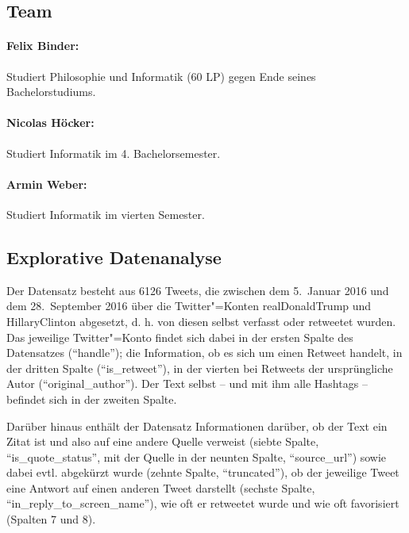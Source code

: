 \documentclass[BCOR0mm,fontsize=12pt,paper=a4,final,numbers=noenddot]{scrartcl}
\begin{document}

\subsection{Team}

\paragraph*{Felix Binder:} Studiert Philosophie und Informatik (60 LP) gegen Ende seines Bachelorstudiums.

\paragraph*{Nicolas Höcker:} Studiert Informatik im 4. Bachelorsemester.

\paragraph*{Armin Weber:} Studiert Informatik im vierten Semester.


\subsection{Explorative Datenanalyse}

Der Datensatz besteht aus 6126 Tweets, die zwischen dem 5.~Januar 2016 und dem 28.~September 2016 über die Twitter"=Konten realDonaldTrump und HillaryClinton abgesetzt, d.\,\,h. von diesen selbst verfasst oder retweetet wurden. Das jeweilige Twitter"=Konto findet sich dabei in der ersten Spalte des Datensatzes ("`handle"'); die Information, ob es sich um einen Retweet handelt, in der dritten Spalte ("`is\_retweet"'), in der vierten bei Retweets der ursprüngliche Autor ("`original\_author"'). Der Text selbst -- und mit ihm alle Hashtags -- befindet sich in der zweiten Spalte.

Darüber hinaus enthält der Datensatz Informationen darüber, ob der Text ein Zitat ist und also auf eine andere Quelle verweist (siebte Spalte, "`is\_quote\_status"', mit der Quelle in der neunten Spalte, "`source\_url"') sowie dabei evtl. abgekürzt wurde (zehnte Spalte, "`truncated"'), ob der jeweilige Tweet eine Antwort auf einen anderen Tweet darstellt (sechste Spalte, "`in\_reply\_to\_screen\_name"'), wie oft er retweetet wurde und wie oft favorisiert (Spalten 7 und 8).
\end{document}
